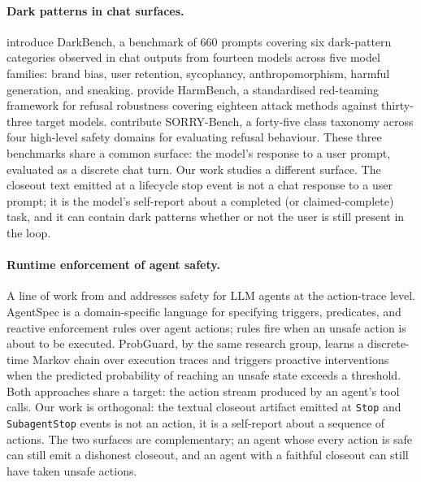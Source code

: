 \documentclass{safeai2026}
\begin{document}
\paragraph{Dark patterns in chat surfaces.}
\citet{darkbench2025} introduce DarkBench, a benchmark of 660 prompts covering six dark-pattern categories observed in chat outputs from fourteen models across five model families: brand bias, user retention, sycophancy, anthropomorphism, harmful generation, and sneaking.
\citet{harmbench2024} provide HarmBench, a standardised red-teaming framework for refusal robustness covering eighteen attack methods against thirty-three target models.
\citet{sorrybench2025} contribute SORRY-Bench, a forty-five class taxonomy across four high-level safety domains for evaluating refusal behaviour.
These three benchmarks share a common surface: the model's response to a user prompt, evaluated as a discrete chat turn.
Our work studies a different surface.
The closeout text emitted at a lifecycle stop event is not a chat response to a user prompt; it is the model's self-report about a completed (or claimed-complete) task, and it can contain dark patterns whether or not the user is still present in the loop.

\paragraph{Runtime enforcement of agent safety.}
A line of work from \citet{agentspec2026} and \citet{probguard2026} addresses safety for LLM agents at the action-trace level.
AgentSpec is a domain-specific language for specifying triggers, predicates, and reactive enforcement rules over agent actions; rules fire when an unsafe action is about to be executed.
ProbGuard, by the same research group, learns a discrete-time Markov chain over execution traces and triggers proactive interventions when the predicted probability of reaching an unsafe state exceeds a threshold.
Both approaches share a target: the action stream produced by an agent's tool calls.
Our work is orthogonal: the textual closeout artifact emitted at \texttt{Stop} and \texttt{SubagentStop} events is not an action, it is a self-report about a sequence of actions.
The two surfaces are complementary; an agent whose every action is safe can still emit a dishonest closeout, and an agent with a faithful closeout can still have taken unsafe actions.
\end{document}
